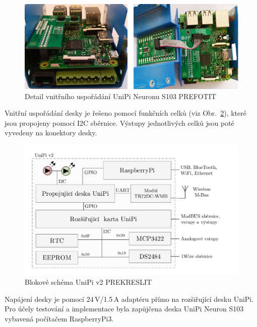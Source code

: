  \begin{figure}[!h]
  \begin{center}
    \includegraphics[scale=0.65]{obrazky/unipi_propojuvnitr}
  \end{center}
	\caption{Detail vnitřního uspořádání UniPi Neuronu S103 \colorbox[rgb]{1,0,0}{PREFOTIT}}
	\label{PicureUniPiKrabicka}
\end{figure}

Vnitřní uspořádání desky je řešeno pomocí funkčních celků (viz Obr.~\ref{BlokUniPi2Schema}), které jsou propojeny pomocí I2C sběrnice. Výstupy jednotlivých celků jsou poté vyvedeny na konektory desky.
 \begin{figure}[!h]
  \begin{center}
    \includegraphics[scale=0.55]{obrazky/unipi_schema2}
  \end{center}
	\caption{Blokové schéma UniPi v2 \colorbox[rgb]{1,0,0}{PREKRESLIT}}
	\label{BlokUniPi2Schema}
\end{figure}



Napájení desky je pomocí 24\,V/1.5\,A adaptéru přímo na rozšiřující desku UniPi. Pro účely testování a implementace byla zapůjčena deska UniPi Neuron S103 vybavená počítačem RaspberryPi3.

